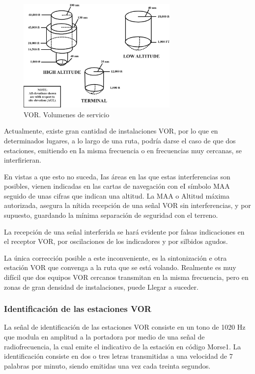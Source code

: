 \begin{figure}[!htb]
  \centering
  \includegraphics[width=0.7\textwidth]{06.radionavegacion/Imagenes/06.02.vor.imagenes/vor-service-volume-02.png}
  \caption{VOR. Volumenes de servicio}
  
  \label{fig:volumenes.de.servicio}
\end{figure}

Actualmente, existe gran cantidad de instalaciones VOR, por lo que en determinados lugares, a lo largo de una ruta, podría darse el caso de que dos estaciones, emitiendo en Ia misma frecuencia o en frecuencias muy cercanas, se interfirieran. 

En vistas a que esto no suceda, Ias áreas en las que estas interferencias son posibles, vienen indicadas en las cartas de navegación con eI símbolo MAA seguido de unas cifras que indican una altitud. La MAA o Altitud máxima autorizada, asegura la nítida recepción de una señal VOR  sin interferencias, y por supuesto, guardando la mínima separación de seguridad con el terreno.

La recepción de una señal interferida se hará evidente por falsas indicaciones en el receptor VOR, por oscilaciones de los indicadores y por silbidos agudos.

La única corrección posible a este inconveniente, es la sintonización e otra estación VOR que convenga a la ruta que se está volando. Realmente es muy difícil que dos equipos VOR cercanos transmitan en la misma frecuencia, pero en zonas de gran densidad de instalaciones, puede Llegar a suceder.

\subsubsection{Identificación de las estaciones VOR}

La señal de identificación de las estaciones VOR consiste en un tono de 1020 Hz que modula en amplitud a la portadora por medio de una señal de radiofrecuencia, la cual emite el indicativo de la estación en código Morse1. La identificación consiste en dos o tres letras transmitidas a una velocidad de 7 palabras por minuto, siendo emitidas una vez cada treinta segundos.

